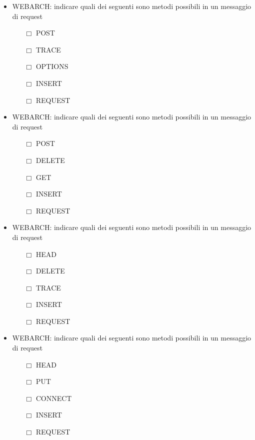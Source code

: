 \documentclass[10pt,twocolumn]{article}
\begin{document}
\begin{itemize}
    \item WEBARCH: indicare quali dei seguenti sono metodi possibili in un messaggio di request
          \begin{itemize}
              \item[$\Box$] POST
              \item[$\Box$] TRACE
              \item[$\Box$] OPTIONS
              \item[$\Box$] INSERT
              \item[$\Box$] REQUEST
          \end{itemize}
\end{itemize}
\begin{itemize}
    \item WEBARCH: indicare quali dei seguenti sono metodi possibili in un messaggio di request
          \begin{itemize}
              \item[$\Box$] POST
              \item[$\Box$] DELETE
              \item[$\Box$] GET
              \item[$\Box$] INSERT
              \item[$\Box$] REQUEST
          \end{itemize}
\end{itemize}
\begin{itemize}
    \item WEBARCH: indicare quali dei seguenti sono metodi possibili in un messaggio di request
          \begin{itemize}
              \item[$\Box$] HEAD
              \item[$\Box$] DELETE
              \item[$\Box$] TRACE
              \item[$\Box$] INSERT
              \item[$\Box$] REQUEST
          \end{itemize}
\end{itemize}
\begin{itemize}
    \item WEBARCH: indicare quali dei seguenti sono metodi possibili in un messaggio di request
          \begin{itemize}
              \item[$\Box$] HEAD
              \item[$\Box$] PUT
              \item[$\Box$] CONNECT
              \item[$\Box$] INSERT
              \item[$\Box$] REQUEST
          \end{itemize}
\end{itemize}
\end{document}
